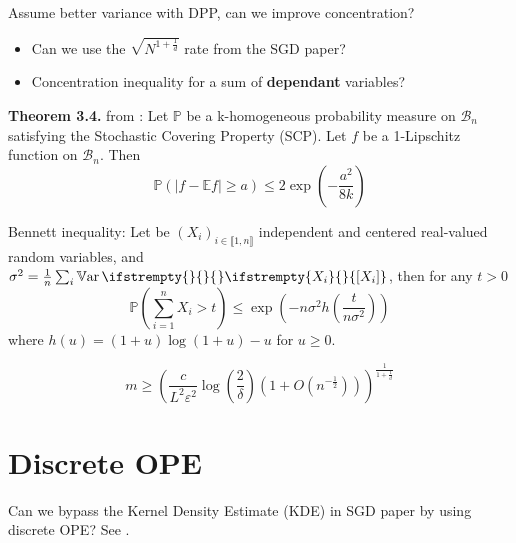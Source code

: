\documentclass{report} %
\renewcommand{\epsilon}{\varepsilon}
\newcommand{\PP}[2]{\mathbb{P} \ifstrempty{#1}{}{_{#1}} \ifstrempty{#2}{}{\left[#2\right]}}
\newcommand{\Var}[2]{\operatorname{\mathbb{V}ar} \ifstrempty{#1}{}{_{#1}} \ifstrempty{#2}{}{\left[#2\right]}}
\newcommand{\1}{\mathds{1}} %
\newcommand{\intint}[2]{\llbracket #1,#2 \rrbracket} %
\theoremstyle{definition} %
\begin{document}
\begin{tcolorbox}
	Assume better variance with DPP, can we improve concentration?
\begin{itemize}
	\item Can we use the $\sqrt {N^{1 + \frac 1 d}}$ rate from the SGD paper?
	\item Concentration inequality for a sum of \textbf{dependant} variables?
\end{itemize}
\end{tcolorbox}

\textbf{Theorem 3.4.} from \cite{pemantle2011rayleighconcentration}: Let $\mathbb{P}$ be a k-homogeneous probability measure on $\mathcal{B}_{n}$ satisfying the Stochastic Covering Property (SCP). Let $f$ be a 1-Lipschitz function on $\mathcal{B}_{n}$. Then
$$
\mathbb{P}(\lvert f-\mathbb{E} f \rvert \geq a) \leq 2 \exp \left(-\frac{a^{2}}{8 k}\right)
$$

Bennett inequality: Let be $(X_i)_{i\in \intint{1}{n}}$ independent and centered real-valued random variables, and $\sigma^2 = \frac{1}{n}\sum_i \Var{}{X_i}$, then for any $t>0$
$$
\mathbb{P}\left(\sum_{i=1}^{n} X_{i}>t\right) \leq \exp \left(-n \sigma^{2} h\left(\frac{t}{n \sigma^{2}}\right)\right)
$$
where $h(u)=(1+u) \log (1+u)-u$ for $u \geq 0$.







$$m \geq \left( \frac{c}{L^{2}\varepsilon ^{2}}\log \left( \frac{2}{\delta }\right) \left( 1+O\left( n^{-\frac{1}{2}}\right) \right) \right) ^{\frac{1}{1+\frac{1}{d}}}$$

\section{Discrete OPE}
\begin{tcolorbox}
	Can we bypass the Kernel Density Estimate (KDE) in SGD paper by using discrete OPE? See \cite{gautschi2004ope}.

\end{tcolorbox}
\end{document}
